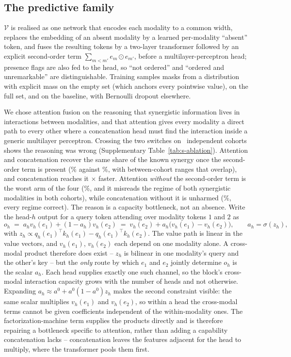 \documentclass[11pt]{article}
\theoremstyle{definition}
\theoremstyle{remark}
\newcommand{\Vc}{\mathcal{V}}
\begin{document}
\subsection{The predictive family}
\label{sec:family}

$\Vc$ is realised as one network that encodes each modality to a common width,
replaces the embedding of an absent modality by a learned per-modality
``absent'' token, and fuses the resulting tokens by a two-layer transformer
followed by an explicit second-order term $\sum_{m<m'} e_m \odot e_{m'}$, before
a multilayer-perceptron head; presence flags are also fed to the head, so
``not ordered'' and ``ordered and unremarkable'' are distinguishable. Training
samples masks from a distribution with explicit mass on the empty set (which
anchors every pointwise value), on the full set, and on the baseline, with
Bernoulli dropout elsewhere.

We chose attention fusion on the reasoning that synergistic information lives in
interactions between modalities, and that attention gives every modality a
direct path to every other where a concatenation head must find the interaction
inside a generic multilayer perceptron. Crossing the two switches on
\ablNCohorts\ independent cohorts shows the reasoning was wrong
(Supplementary Table~\ref{tab:s-ablation}). Attention and concatenation recover
the same share of the known synergy once the second-order term is present
(\ablAttnFmSyn\% against \ablConcatFmSyn\%, with between-cohort ranges that
overlap), and concatenation reaches it \ablSpeedup$\times$ faster. Attention
\emph{without} the second-order term is the worst arm of the four
(\ablAttnNoFmSyn\%, and it misreads the regime of both synergistic modalities
in both cohorts), while concatenation without it is unharmed
(\ablConcatNoFmSyn\%, every regime correct). The reason is a capacity bottleneck, not an
absence. Write the head-$h$ output for a query token attending over modality
tokens $1$ and $2$ as
\[
  o_h \;=\; a_h v_h(e_1) + (1-a_h) v_h(e_2)
       \;=\; v_h(e_2) + a_h\big(v_h(e_1)-v_h(e_2)\big),
  \qquad a_h=\sigma(z_h),
\]
with $z_h \propto q_h(e_1)^\top k_h(e_1) - q_h(e_1)^\top k_h(e_2)$. The value
path is linear in the value vectors, and $v_h(e_1)$, $v_h(e_2)$ each depend on
one modality alone. A cross-modal product therefore does exist -- $z_h$ is
bilinear in one modality's query and the other's key -- but the \emph{only}
route by which $e_1$ and $e_2$ jointly determine $o_h$ is the scalar $a_h$. Each
head supplies exactly one such channel, so the block's cross-modal interaction
capacity grows with the number of heads and not otherwise. Expanding
$a_h \approx a^0 + a^0(1-a^0)z_h$ makes the second constraint visible: the same
scalar multiplies $v_h(e_1)$ and $v_h(e_2)$, so within a head the cross-modal
terms cannot be given coefficients independent of the within-modality ones. The
factorization-machine term supplies the products directly and is therefore
repairing a bottleneck specific to attention, rather than adding a capability
concatenation lacks -- concatenation leaves the features adjacent for the head
to multiply, where the transformer pools them first.
\end{document}
